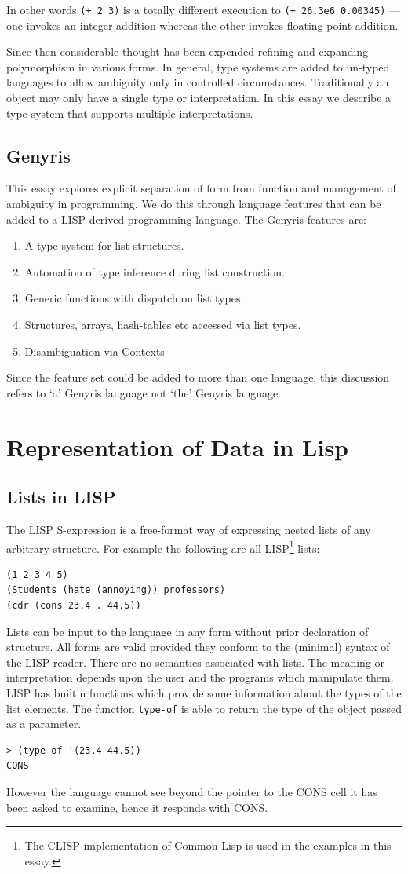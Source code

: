 \documentclass[a4paper,12pt,dvips]{article}
\begin{document}
In other words \texttt{(+ 2 3)} is a totally different execution to \texttt{(+ 26.3e6 0.00345)} --- one invokes an integer addition whereas the other invokes floating point addition. 

Since then considerable  thought has been expended refining and expanding polymorphism in various forms. \cite{cardelli} In general, type systems are added to un-typed languages to allow ambiguity only in controlled circumstances. Traditionally an object may only have a single type or interpretation.  In this essay we describe a type system that supports 
multiple interpretations. 

\subsection{Genyris}
This essay explores explicit separation of form from function and management of ambiguity in programming. We do this through language features that can be added to a LISP-derived programming language. The Genyris features are:
\begin{enumerate}
\item A type system for list structures.
\item Automation of type inference during list construction.
\item Generic functions with dispatch on list types.
\item Structures, arrays, hash-tables etc accessed via list types.
\item Disambiguation via Contexts
\end{enumerate}
Since the feature set could be added to more than one language, this discussion refers to `a' Genyris language not `the' Genyris language.  
\section{Representation of Data in Lisp}
\subsection{Lists in LISP}
The LISP S-expression is a free-format way of expressing nested lists of any arbitrary structure. For example the following are all LISP\footnote{The CLISP implementation of Common Lisp is used in the examples in this essay.} lists:
\begin{verbatim}
(1 2 3 4 5)
(Students (hate (annoying)) professors)
(cdr (cons 23.4 . 44.5))
\end{verbatim}
Lists can be input to the language in any form without prior declaration of structure. All forms are valid provided they conform to the (minimal) syntax of the LISP reader. There are no semantics associated with lists. The meaning or interpretation depends upon the user and the programs which manipulate them. LISP has builtin functions which provide some information about the types of the list elements. The function \texttt{type-of} is able to return the type of the object passed as a parameter. 
\begin{verbatim}
> (type-of '(23.4 44.5)) 
CONS
\end{verbatim}
However the language cannot see beyond the pointer to the CONS cell it has been asked to examine, hence it responds with CONS. 
\end{document}
